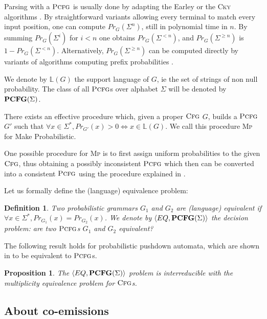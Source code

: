 \documentclass[submission]{eptcs} \usepackage{breakurl}             \usepackage[english]{babel}
\newtheorem{definition}{Definition}
\newtheorem{proposition}{Proposition}
\providecommand{\PCFGclass}{\textup{\textbf{PCFG}(\ensuremath{\Sigma})}}
\providecommand{\CFG}{\ensuremath{\textsc{Cfg}}}
\providecommand{\PCFG}{\ensuremath{\textsc{Pcfg}}}
\providecommand{\Naming}{\ensuremath{\mathbb L}}
\providecommand{\Prob}{\ensuremath{Pr}}
\begin{document}
Parsing with a $\PCFG$ is usually done by adapting the Earley or the
\textsc{Cky} algorithms \cite{jelinek92}. By straightforward variants allowing every terminal to match every input position, one can compute $\Prob_G(\Sigma^n)$, still in polynomial time in $n$. By summing $\Prob_G(\Sigma^i)$ for $i<n$ one obtains 
$\Prob_G(\Sigma^{<n})$, and $\Prob_G(\Sigma^{\geq n})$ is $1-\Prob_G(\Sigma^{<n})$. Alternatively, $\Prob_G(\Sigma^{\geq n})$ can be computed directly by variants of algorithms computing prefix probabilities \cite{jelinek91,stol95}.

We denote by $\Naming(G)$ the support language of $G$, ie the set of strings of non null probability.
The class of all $\PCFG$s over alphabet $\Sigma$ will be denoted by $\PCFGclass$.

There exists an effective procedure which, given a proper $\CFG$ $G$, builds a $\PCFG$ $G'$ such that $\forall x\in\Sigma^*, \Prob_{G'}(x)>0\iff x\in \Naming(G)$. We call this procedure \textsc{Mp} for Make Probabilistic.

One possible procedure for \textsc{Mp} is to first assign uniform probabilities to the given $\CFG$, thus obtaining a possibly inconsistent $\PCFG$ which then can be converted into a consistent $\PCFG$ using the procedure explained in \cite{gecs10}.

Let us formally define the (language) equivalence problem:
\begin{definition}
Two probabilistic grammars $G_1$ and $G_2$ are \emph{(language) equivalent} if $\forall x\in\Sigma^*,\Prob_{G_1}(x)=\Prob_{G_2}(x)$.
We denote by $\langle EQ,\PCFGclass\rangle$ the decision problem: are two $\PCFG$s $G_1$ and $G_2$ equivalent?
\end{definition}
The following result holds for  probabilistic pushdown automata, which are shown in \cite{abne99} to be equivalent to $\PCFG$s.
\begin{proposition}\cite{fore14}
The $\langle EQ,\PCFGclass\rangle$ problem is interreducible with the multiplicity equivalence problem for $\CFG$s.
\end{proposition}



\subsection{About co-emissions} 
\end{document}
